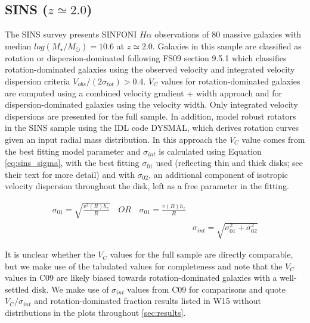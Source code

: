 \documentclass[fleqn,usenatbib]{mn2e}
\begin{document}
\subsection{SINS ($z\simeq2.0$)}\label{subsec:SINS}
The SINS survey \citep[FS09]{ForsterSchreiber2009} presents SINFONI $H\alpha$ observations of 80 massive galaxies with median $log(M_{\star}/M_{\odot})=10.6$ at $z\simeq2.0$.
Galaxies in this sample are classified as rotation or dispersion-dominated following FS09 section 9.5.1 which classifies rotation-dominated galaxies using the observed velocity and integrated velocity dispersion criteria $V_{obs}/(2\sigma_{tot}) > 0.4$.
$V_{C}$ values for rotation-dominated galaxies are computed using a combined velocity gradient + width approach \citep{ForsterSchreiber2006} and for dispersion-dominated galaxies using the velocity width.
Only integrated velocity dispersions are presented for the full sample.
In addition, \cite[C09]{Cresci2009} model robust rotators in the SINS sample using the IDL code DYSMAL, which derives rotation curves given an input radial mass distribution.
In this approach the $V_{C}$ value comes from the best fitting model parameter and $\sigma_{int}$ is calculated using Equation \ref{eq:sins_sigma}, with the best fitting $\sigma_{01}$ used (reflecting thin and thick disks; see their text for more detail) and with $\sigma_{02}$, an additional component of isotropic velocity dispersion throughout the disk, left as a free parameter in the fitting.

\begin{equation}\label{eq:sins_sigma}
\begin{split}
\sigma_{01} = \sqrt{\frac{v^{2}(R)h_{z}}{R}} \quad OR \quad \sigma_{01} = \frac{v(R)h_{z}}{R} \\
& \sigma_{int} = \sqrt{\sigma_{01}^{2} + \sigma_{02}^{2}}
\end{split}
\end{equation}

It is unclear whether the $V_{C}$ values for the full sample are directly comparable, but we make use of the tabulated values for completeness and note that the $V_{C}$ values in C09 are likely biased towards rotation-dominated galaxies with a well-settled disk.
We make use of $\sigma_{int}$ values from C09 for comparisons and quote $V_{C}/\sigma_{int}$ and rotation-dominated fraction results listed in W15 without distributions in the plots throughout \cref{sec:results}.
\end{document}
